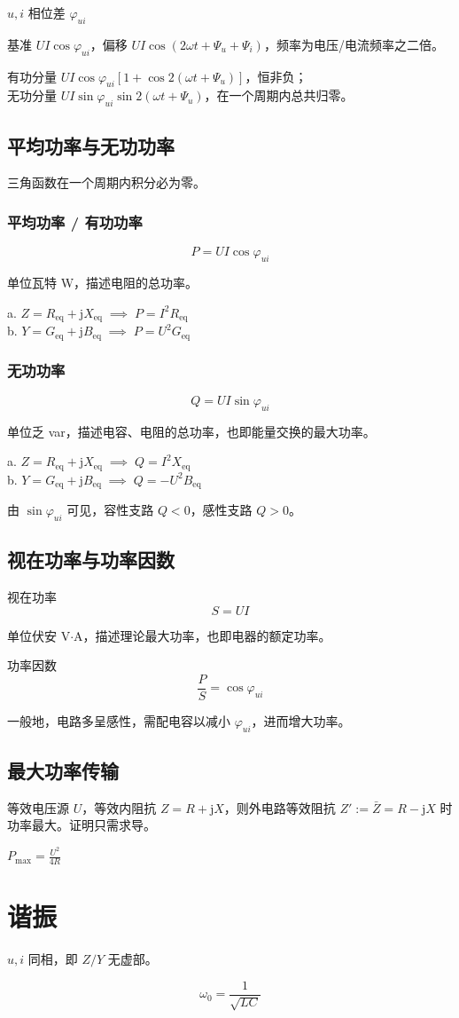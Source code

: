 \documentclass[12pt, a4paper, UTF8, openany]{ctexbook}
\newcommand{\eq}[1]{#1_{\text{eq}}}
\newcommand{\unit}{\mathrm{j}}
\begin{document}
        $u, i$ 相位差 $\varphi_{ui}$

        基准 $UI \cos\varphi_{ui}$，偏移 $UI \cos(2 \omega t + \Psi_u + \Psi_i)$，频率为电压/电流频率之二倍。

        有功分量 $UI \cos\varphi_{ui} [1 + \cos 2(\omega t + \Psi_u)]$，恒非负；\\
        无功分量 $UI \sin\varphi_{ui} \sin 2(\omega t + \Psi_u)$，在一个周期内总共归零。

        \subsection{平均功率与无功功率}
        三角函数在一个周期内积分必为零。

            \subsubsection{平均功率 / 有功功率}
            $$P = UI \cos\varphi_{ui}$$

            单位瓦特 W，描述电阻的总功率。

            a. $Z = \eq{R} + \unit\eq{X} \; \implies \; P = I^2 \eq{R}$ \\
            b. $Y = \eq{G} + \unit\eq{B} \; \implies \; P = U^2 \eq{G}$

            \subsubsection{无功功率}
            $$Q = UI \sin\varphi_{ui}$$

            单位乏 var，描述电容、电阻的总功率，也即能量交换的最大功率。

            a. $Z = \eq{R} + \unit\eq{X} \; \implies \; Q = I^2 \eq{X}$ \\
            b. $Y = \eq{G} + \unit\eq{B} \; \implies \; Q = -U^2 \eq{B}$

            由 $\sin\varphi_{ui}$ 可见，容性支路 $Q < 0$，感性支路 $Q > 0$。

        \subsection{视在功率与功率因数}
        视在功率 $$S = UI$$

        单位伏安 V$\cdot$A，描述理论最大功率，也即电器的额定功率。

        功率因数 $$\frac{P}{S} = \cos\varphi_{ui}$$

        一般地，电路多呈感性，需配电容以减小 $\varphi_{ui}$，进而增大功率。

        \subsection{最大功率传输}

        等效电压源 $U$，等效内阻抗 $Z = R + \unit X$，则外电路等效阻抗 $Z' := \bar{Z} = R - \unit X$ 时功率最大。证明只需求导。

        $P_{\max} = \frac{U^2}{4R}$

        \section{谐振}
        $u, i$ 同相，即 $Z/Y$ 无虚部。

        $$\omega_0 = \frac{1}{\sqrt{LC}}$$
\end{document}
